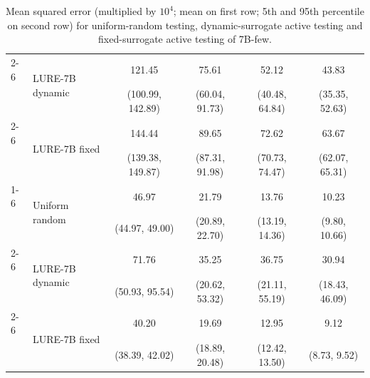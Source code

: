 \begin{table}[h]
\begin{tabular}{l l c c c c}
        \cline{2-6}
        & \multirow{2}{*}{LURE-7B dynamic} & 121.45 	&75.61 	&52.12  &	43.83 \\
        &&(100.99, 142.89)&(60.04, 91.73)&(40.48, 64.84)&(35.35, 52.63)\\
        \cline{2-6}
        & \multirow{2}{*}{LURE-7B fixed} & 144.44  &	89.65  &	72.62  &	63.67 \\
        &&(139.38, 149.87)&(87.31, 91.98)&(70.73, 74.47)&(62.07, 65.31)\\
        \cline{1-6}
        \multirow{6}{*}{Subj}& \multirow{2}{*}{Uniform random} & 46.97 &	21.79 &	13.76 &	10.23 \\
        &&(44.97, 49.00)&(20.89, 22.70)&(13.19, 14.36)&(9.80, 10.66)\\
        \cline{2-6}
        & \multirow{2}{*}{LURE-7B dynamic} & 71.76&	35.25 &	36.75&	30.94 \\
        && (50.93, 95.54)&(20.62, 53.32)& (21.11, 55.19)&(18.43, 46.09)\\
        \cline{2-6}
        & \multirow{2}{*}{LURE-7B fixed} & 40.20 &	19.69 &	12.95 &	9.12 \\
        &&(38.39, 42.02)&(18.89, 20.48)&(12.42, 13.50)&(8.73, 9.52)\\
        \bottomrule
    \end{tabular}
    \vspace{1em}
    \caption{
        Mean squared error (multiplied by $10^4$; mean on first row; 5th and 95th percentile on second row) for uniform-random testing, dynamic-surrogate active testing and fixed-surrogate active testing of 7B-few.
    }
    \label{tab:dynamic_7b}
\end{table}


